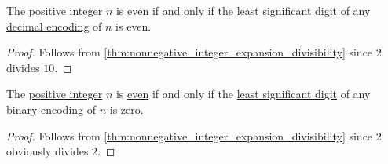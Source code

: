 \begin{corollary}\label{thm:nonnegative_integer_decimal_expansion_parity}
  The \hyperref[def:integers]{positive integer} \( n \) is \hyperref[def:integer_parity]{even} if and only if the \hyperref[def:endianness]{least significant digit} of any \hyperref[def:ring_of_unsigned_integers]{decimal encoding} of \( n \) is even.
\end{corollary}
\begin{proof}
  Follows from \cref{thm:nonnegative_integer_expansion_divisibility} since \( 2 \) divides \( 10 \).
\end{proof}

\begin{corollary}\label{thm:nonnegative_integer_binary_expansion_parity}
  The \hyperref[def:integers]{positive integer} \( n \) is \hyperref[def:integer_parity]{even} if and only if the \hyperref[def:endianness]{least significant digit} of any \hyperref[def:ring_of_unsigned_integers]{binary encoding} of \( n \) is zero.
\end{corollary}
\begin{proof}
  Follows from \cref{thm:nonnegative_integer_expansion_divisibility} since \( 2 \) obviously divides \( 2 \).
\end{proof}

